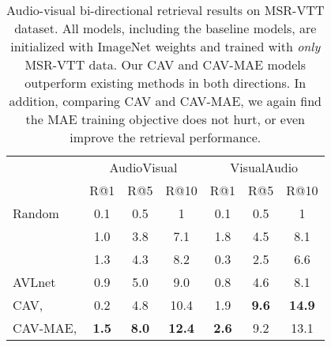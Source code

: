 \documentclass{article} \usepackage{iclr2023_conference,times}
\begin{document}
\begin{table}[t]
\centering
\caption{Audio-visual bi-directional retrieval results on MSR-VTT dataset. All models, including the baseline models, are initialized with ImageNet weights and trained with \emph{only} MSR-VTT data. Our CAV and CAV-MAE models outperform existing methods in both directions. In addition, comparing CAV and CAV-MAE, we again find the MAE training objective does not hurt, or even improve the retrieval performance.}
\label{tab:msr_vtt_ft}
\begin{tabular}{@{}lcccccc@{}}
\toprule
                      & \multicolumn{3}{c}{AudioVisual} & \multicolumn{3}{c}{VisualAudio} \\ \cmidrule(l){2-7} 
                      & R@1           & R@5           & R@10           & R@1           & R@5           & R@10           \\ \midrule
Random                & 0.1           & 0.5           & 1              & 0.1           & 0.5           & 1              \\ \midrule
\cite{boggust2019grounding}       & 1.0           & 3.8           & 7.1            & 1.8           & 4.5           & 8.1            \\
\cite{arandjelovic2018objects} & 1.3           & 4.3           & 8.2            & 0.3           & 2.5           & 6.6            \\
AVLnet~\citep{rouditchenko2021avlnet}                & 0.9           & 5.0           & 9.0            & 0.8           & 4.6           & 8.1            \\ \midrule
CAV,            & 0.2           & 4.8           & 10.4           & 1.9           & \textbf{9.6}  & \textbf{14.9}  \\
CAV-MAE,        & \textbf{1.5}  & \textbf{8.0}  & \textbf{12.4}  & \textbf{2.6}  & 9.2           & 13.1           \\ \bottomrule
\end{tabular}
\end{table}
\end{document}
